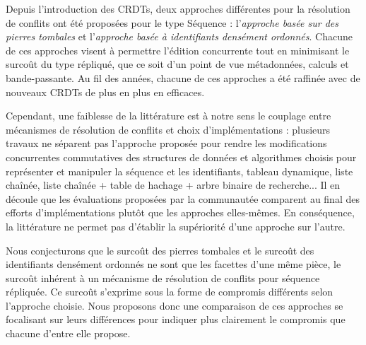 Depuis l'introduction des \acp{CRDT}, deux approches différentes pour la résolution de conflits ont été proposées pour le type Séquence : l'\emph{approche basée sur des pierres tombales} et l'\emph{approche basée à identifiants densément ordonnés}.
Chacune de ces approches visent à permettre l'édition concurrente tout en minimisant le surcoût du type répliqué, que ce soit d'un point de vue métadonnées, calculs et bande-passante.
Au fil des années, chacune de ces approches a été raffinée avec de nouveaux \acp{CRDT} de plus en plus en efficaces.

Cependant, une faiblesse de la littérature est à notre sens le couplage entre mécanismes de résolution de conflits et choix d'implémentations : plusieurs travaux \cite{2009-treedoc-preguica, 2009-logoot-weiss, 2013-logootsplit,briot:hal-01343941} ne séparent pas l'approche proposée pour rendre les modifications concurrentes commutatives des structures de données et algorithmes choisis pour représenter et manipuler la séquence et les identifiants, \eg tableau dynamique, liste chaînée, liste chaînée + table de hachage + arbre binaire de recherche...
Il en découle que les évaluations proposées par la communautée comparent au final des efforts d'implémentations plutôt que les approches elles-mêmes.
En conséquence, la littérature ne permet pas d'établir la supériorité d'une approche sur l'autre.

Nous conjecturons que le surcoût des pierres tombales et le surcoût des identifiants densément ordonnés ne sont que les facettes d'une même pièce, \ie le surcoût inhérent à un mécanisme de résolution de conflits pour séquence répliquée.
Ce surcoût s'exprime sous la forme de compromis différents selon l'approche choisie.
Nous proposons donc une comparaison de ces approches se focalisant sur leurs différences pour indiquer plus clairement le compromis que chacune d'entre elle propose.


